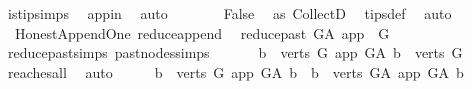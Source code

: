\begin{isabellebody}
\ is{\isacharunderscore}{\kern0pt}tip{\isachardot}{\kern0pt}simps\ \isamarkupfalse%
\ app{\isacharunderscore}{\kern0pt}in\ \isamarkupfalse%
\ auto\isanewline
\ \ \ \ \isamarkupfalse%
\ \isamarkupfalse%
\ {\isachardoublequoteopen}False{\isachardoublequoteclose}\ \isamarkupfalse%
\ as{}\ CollectD\ \isamarkupfalse%
\ tips{\isacharunderscore}{\kern0pt}def\ \isamarkupfalse%
\ auto\isanewline
\ \ \isamarkupfalse%
\isanewline
{}\isamarkupfalse%
%
\endisatagproof
{\isafoldproof}%
%
\isadelimproof
\isanewline
%
\endisadelimproof
\isanewline
{}\isamarkupfalse%
\ {\isacharparenleft}{\kern0pt}\ Honest{\isacharunderscore}{\kern0pt}Append{\isacharunderscore}{\kern0pt}One{\isacharparenright}{\kern0pt}\ reduce{\isacharunderscore}{\kern0pt}append{\isacharcolon}{\kern0pt}\isanewline
\ \ {\isachardoublequoteopen}reduce{\isacharunderscore}{\kern0pt}past\ G{\isacharunderscore}{\kern0pt}A\ app\ {\isacharequal}{\kern0pt}\ G{\isachardoublequoteclose}\isanewline
%
\isadelimproof
\ \ %
\endisadelimproof
%
\isatagproof
{}\isamarkupfalse%
\ reduce{\isacharunderscore}{\kern0pt}past{\isachardot}{\kern0pt}simps\ past{\isacharunderscore}{\kern0pt}nodes{\isachardot}{\kern0pt}simps\ \isanewline
{}\isamarkupfalse%
\ {\isacharminus}{\kern0pt}\isanewline
\ \ \isamarkupfalse%
\ {\isachardoublequoteopen}{\isacharbraceleft}{\kern0pt}b\ {\isasymin}\ verts\ G{\isachardot}{\kern0pt}\ app\ {\isasymrightarrow}\isactrlsup {\isacharplus}{\kern0pt}\isactrlbsub G{\isacharunderscore}{\kern0pt}A\isactrlesub \ b{\isacharbraceright}{\kern0pt}\ {\isacharequal}{\kern0pt}\ verts\ G{\isachardoublequoteclose}\isanewline
\ \ \ \ \isamarkupfalse%
\ reaches{\isacharunderscore}{\kern0pt}all\ \isamarkupfalse%
\ auto\isanewline
\ \ \isamarkupfalse%
\ \isamarkupfalse%
\ {\isachardoublequoteopen}{\isacharbraceleft}{\kern0pt}b\ {\isasymin}\ verts\ G{\isachardot}{\kern0pt}\ app\ {\isasymrightarrow}\isactrlsup {\isacharplus}{\kern0pt}\isactrlbsub G{\isacharunderscore}{\kern0pt}A\isactrlesub \ b{\isacharbraceright}{\kern0pt}\ {\isacharequal}{\kern0pt}\ {\isacharbraceleft}{\kern0pt}b\ {\isasymin}\ verts\ G{\isacharunderscore}{\kern0pt}A{\isachardot}{\kern0pt}\ app\ {\isasymrightarrow}\isactrlsup {\isacharplus}{\kern0pt}\isactrlbsub G{\isacharunderscore}{\kern0pt}A\isactrlesub \ b{\isacharbraceright}{\kern0pt}{\isachardoublequoteclose}\isanewline

\end{isabellebody}
